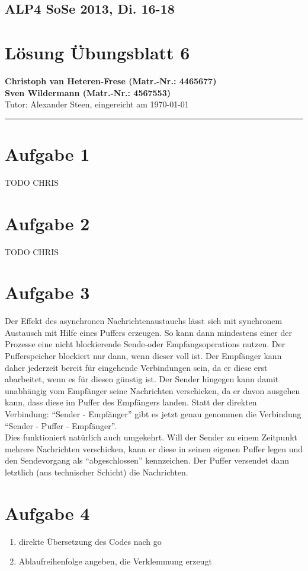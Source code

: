 \documentclass[11pt,a4paper,DIV=10,]{scrartcl}
\begin{document}
\subsection*{ALP4 SoSe 2013, Di. 16-18}
\section*{Lösung Übungsblatt 6}
\textbf{Christoph van Heteren-Frese (Matr.-Nr.: 4465677)} \\ \textbf{Sven Wildermann (Matr.-Nr.: 4567553)}\\
Tutor: Alexander Steen, eingereicht am \today\\
\hrule

\section*{Aufgabe 1}

TODO CHRIS
\section*{Aufgabe 2}

TODO CHRIS 
\section*{Aufgabe 3}
Der Effekt des asynchronen Nachrichtenaustauchs lässt sich mit synchronem Austausch mit Hilfe eines Puffers erzeugen. So kann dann mindestens einer der Prozesse eine nicht blockierende Sende-oder Empfangsoperations nutzen. Der Pufferspeicher blockiert nur dann, wenn dieser voll ist. Der Empfänger kann daher jederzeit bereit für eingehende Verbindungen sein, da er diese erst abarbeitet, wenn es für diesen günstig ist. Der Sender hingegen kann damit unabhängig vom Empfänger seine Nachrichten verschicken, da er davon ausgehen kann, dass diese im Puffer des Empfängers landen. 
Statt der direkten Verbindung: ``Sender - Empfänger'' gibt es jetzt genau genommen die Verbindung ``Sender - Puffer - Empfänger''.  \\
Dies funktioniert natürlich auch umgekehrt. Will der Sender zu einem Zeitpunkt mehrere Nachrichten verschicken, kann er diese in seinen eigenen Puffer legen und den Sendevorgang als ``abgeschlossen'' kennzeichen. Der Puffer versendet dann letztlich (aus technischer Schicht) die Nachrichten. 

\section*{Aufgabe 4}
\begin{enumerate}
 \item direkte Übersetzung des Codes nach go 
 
 
 \item Ablaufreihenfolge angeben, die Verklemmung erzeugt \\
 
\end{enumerate}
\end{document}
